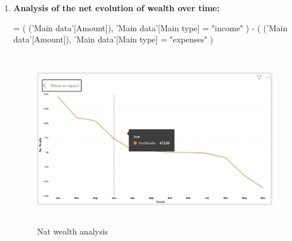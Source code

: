 \begin{enumerate}
\begin{figure}[h]
\end{figure} 


 \item \textbf{Analysis of the net evolution of wealth over time:}

 = 
(
    ('Main data'[Amount]),
    'Main data'[Main type] = "income"
) - 
(
    ('Main data'[Amount]),
    'Main data'[Main type] = "expenses"
)
\begin{figure}[h]
    \centering
    \includegraphics[width=5.0in, height=3.0in]{Figure/Netwealth per month.png}
    \caption{Nat wealth analysis}
    \label{fig:enter-label}
   
\end{figure}












\end{enumerate}



